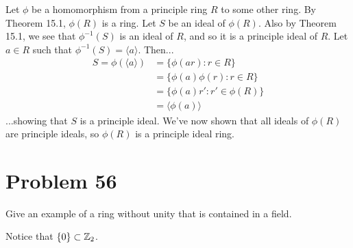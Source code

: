 \documentclass{article}
\begin{document}
Let $\phi$ be a homomorphism from a principle ring $R$ to some other ring.
By Theorem 15.1, $\phi(R)$ is a ring.
Let $S$ be an ideal of $\phi(R)$.  Also by Theorem 15.1, we see
that $\phi^{-1}(S)$ is an ideal of $R$, and so it is a principle ideal of $R$.
Let $a\in R$ such that $\phi^{-1}(S)=\langle a\rangle$.  Then...
\begin{align*}
S = \phi(\langle a\rangle) &= \{\phi(ar):r\in R\} \\
 &= \{\phi(a)\phi(r):r\in R\} \\
 &= \{\phi(a)r':r'\in\phi(R)\} \\
 &= \langle\phi(a)\rangle
\end{align*}
...showing that $S$ is a principle ideal.  We've now shown that all
ideals of $\phi(R)$ are principle ideals, so $\phi(R)$ is a principle
ideal ring.

\section*{Problem 56}

Give an example of a ring without unity that is contained in a field.

Notice that $\{0\}\subset\mathbb{Z}_2$.
\end{document}

